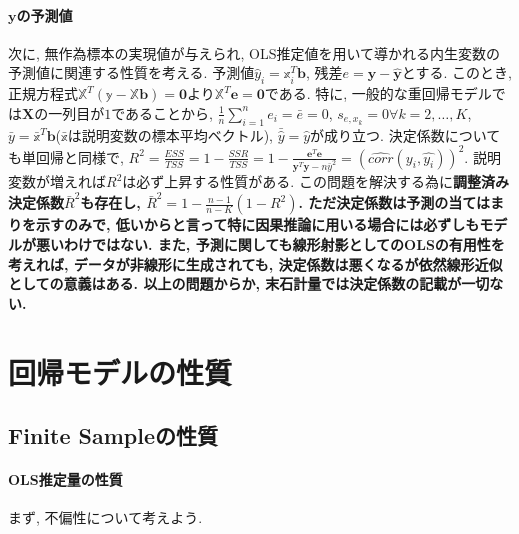 \documentclass[paper=a4paper,fontsize=10pt]{jlreq}
\begin{document}
\paragraph{$\mathbf{y}$の予測値}
次に, 無作為標本の実現値が与えられ, OLS推定値を用いて導かれる内生変数の予測値に関連する性質を考える. 予測値$\hat{y}_i=\mathbb{x}_i^{T}\mathbf{b}$, 残差$e=\mathbf{y}-\hat{\mathbf{y}}$とする. このとき, 正規方程式$\mathbb{X}^T(\mathbb{y}-\mathbb{X}\mathbf{b})=\mathbf{0}$より$\mathbb{X}^T\mathbf{e}=\mathbf{0}$である. 特に, 一般的な重回帰モデルでは$\mathbf{X}$の一列目が$1$であることから, $\frac{1}{n}\sum_{i=1}^{n}e_i=\bar{e}=0$, $s_{e, x_k}=0　\forall k=2,\dots,K$, $\bar{y}=\bar{\mathbb{x}}^{T}\mathbf{b}$($\bar{\mathbb{x}}$は説明変数の標本平均ベクトル), $\bar{\hat{y}}=\hat{y}$が成り立つ. 決定係数についても単回帰と同様で, $R^2=\frac{ESS}{TSS}=1-\frac{SSR}{TSS}=1-\frac{\mathbf{e}^T\mathbf{e}}{\mathbf{y}^T\mathbf{y}-n\bar{y}^2}=(\hat{corr}(y_i,\hat{y_i}))^2$. 説明変数が増えれば$R^2$は必ず上昇する性質がある. この問題を解決する為に\rmfamily\mcfamily\bfseries{調整済み決定係数}\mdseries $\bar{R}^2$も存在し, $\bar{R}^2=1-\frac{n-1}{n-K}(1-R^2)$. ただ決定係数は予測の当てはまりを示すのみで, 低いからと言って特に因果推論に用いる場合には必ずしもモデルが悪いわけではない. また, 予測に関しても線形射影としてのOLSの有用性を考えれば, データが非線形に生成されても, 決定係数は悪くなるが依然線形近似としての意義はある. 以上の問題からか, 末石計量では決定係数の記載が一切ない.\\

\section{回帰モデルの性質}
\subsection{Finite Sampleの性質}
\paragraph{OLS推定量の性質}
まず, 不偏性について考えよう. \\
\end{document}
